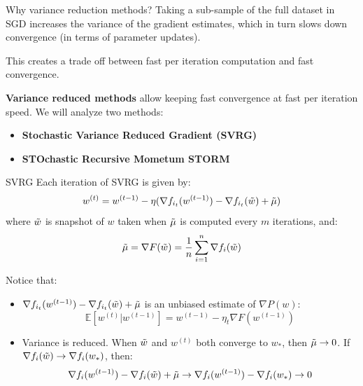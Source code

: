 \documentclass[10pt]{beamer}
\begin{document}
\begin{frame}{Why variance reduction methods?}
    Taking a sub-sample of the full dataset in SGD increases the variance of the gradient estimates, which in turn slows down convergence (in terms of parameter updates). 
    
    \vspace{5mm}
    This creates a trade off between fast per iteration computation and fast convergence.
    
    \vspace{5mm}
    \textbf{Variance reduced methods} allow keeping fast convergence at fast per iteration speed. We will analyze two methods:
    \begin{itemize}
        \item \textbf{Stochastic Variance Reduced Gradient (SVRG)}
        \item \textbf{STOchastic Recursive Mometum STORM}
    \end{itemize}
    
\end{frame}

\begin{frame}{SVRG}
    Each iteration of SVRG is given by:
    $$w^{(t)} = w^{(t-1)} -\eta(\nabla f_{i_t}(w^{(t-1)}) - \nabla f_{i_t}(\Tilde{w}) + \Tilde{\mu})$$
    where $\Tilde{w}$ is snapshot of $w$ taken when $\Tilde{\mu}$ is computed every $m$ iterations, and:
    $$\Tilde{\mu} = \nabla F(\Tilde{w}) = \frac{1}{n}\sum_{i=1}^n \nabla f_i(\Tilde{w})$$
    
    Notice that: 
    \begin{itemize}
        \item $\nabla f_{i_t}(w^{(t-1)}) - \nabla f_{i_t}(\Tilde{w}) + \Tilde{\mu}$ is an unbiased estimate of $\nabla P(w)$:
    $$\mathbb{E}[w^{(t)} | w^{(t-1)}] = w^{(t-1)}-\eta_t \nabla F(w^{(t-1)})$$
        \item Variance is reduced. When $\Tilde{w}$ and $w^{(t)}$ both converge to $w_{\ast}$, then $\Tilde{\mu} \rightarrow 0$. If $\nabla f_i(\Tilde{w}) \rightarrow \nabla f_i(w_{\ast})$, then:
        $$\nabla f_i(w^{(t-1)}) - \nabla f_i(\Tilde{w}) + \Tilde{\mu} \rightarrow \nabla f_i(w^{(t-1)}) - \nabla f_i(w_{\ast}) \rightarrow 0$$
    \end{itemize}
\end{frame}
\end{document}

